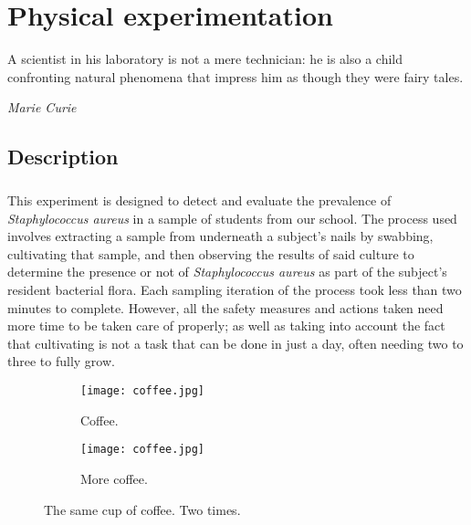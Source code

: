 \chapter{Physical experimentation}
\epigraph{A scientist in his laboratory is not a mere technician: he is also a child confronting natural phenomena that impress him as though they were fairy tales.}{\textit{Marie Curie}}
\section{Description}
\paragraph{}This experiment is designed to detect and evaluate the prevalence of \emph{Staphylococcus aureus} in a sample of students from our school. The process used involves extracting a sample from underneath a subject's nails by swabbing, cultivating that sample, and then observing the results of said culture to determine the presence or not of \emph{Staphylococcus aureus} as part of the subject's resident bacterial flora. Each sampling iteration of the process took less than two minutes to complete. However, all the safety measures and actions taken need more time to be taken care of properly; as well as taking into account the fact that cultivating is not a task that can be done in just a day, often needing two to three to fully grow.
\begin{figure}[h!] \centering \begin{subfigure}[b]{0.4\linewidth} \texttt{[image: coffee.jpg]} \caption{Coffee.} \end{subfigure} \begin{subfigure}[b]{0.4\linewidth} \texttt{[image: coffee.jpg]} \caption{More coffee.} \end{subfigure} \caption{The same cup of coffee. Two times.} \label{fig:coffee}\end{figure}
